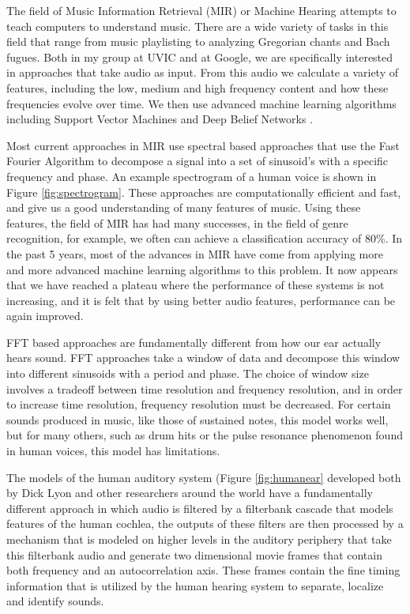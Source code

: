 The field of Music Information Retrieval (MIR) or Machine Hearing
\cite{marsyas} attempts to teach computers to understand music.  There
are a wide variety of tasks in this field that range from music
playlisting to analyzing Gregorian chants and Bach fugues.  Both in my
group at UVIC and at Google, we are specifically interested in
approaches that take audio as input.  From this audio we calculate a
variety of features, including the low, medium and high frequency
content and how these frequencies evolve over time.  We then use
advanced machine learning algorithms including Support Vector Machines
and Deep Belief Networks \cite{bengio2007}.  

Most current approaches in MIR use spectral based approaches that use
the Fast Fourier Algorithm to decompose a signal into a set of
sinusoid's with a specific frequency and phase.  An example spectrogram
of a human voice is shown in Figure \ref{fig:spectrogram}.  These approaches are
computationally efficient and fast, and give us a good understanding
of many features of music.  Using these features, the field of MIR has
had many successes, in the field of genre recognition, for example, we
often can achieve a classification accuracy of 80\%.  In the past 5
years, most of the advances in MIR have come from applying more and
more advanced machine learning algorithms to this problem.  It now
appears that we have reached a plateau where the performance of these
systems is not increasing, and it is felt that by using better audio
features, performance can be again improved.


FFT based approaches are fundamentally different from how our ear
actually hears sound.  FFT approaches take a window of data and
decompose this window into different sinusoids with a period and
phase.  The choice of window size involves a tradeoff between time
resolution and frequency resolution, and in order to increase time
resolution, frequency resolution must be decreased.  For certain
sounds produced in music, like those of sustained notes, this model
works well, but for many others, such as drum hits or the pulse
resonance phenomenon found in human voices, this model has
limitations.

The models of the human auditory system (Figure \ref{fig:humanear}
developed both by Dick Lyon \cite{slaney93} and other researchers
around the world have a fundamentally different approach in which
audio is filtered by a filterbank cascade that models features of the
human cochlea, the outputs of these filters are then processed by a
mechanism that is modeled on higher levels in the auditory periphery
that take this filterbank audio and generate two dimensional movie
frames that contain both frequency and an autocorrelation axis.  These
frames contain the fine timing information that is utilized by the
human hearing system to separate, localize and identify sounds.


